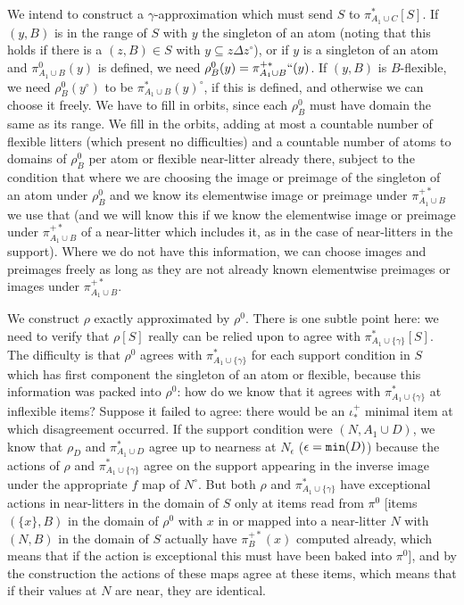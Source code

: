 \documentclass[112pt]{article}
\begin{document}
\begin{description}
We intend to construct a $\gamma$-approximation which must send $S$ to  $\pi_{A_1 \cup C}^*[S]$.  If $(y,B)$ is in the range of $S$ with $y$ the singleton of an atom 
(noting that this holds if  there is a $(z,B)\in S$ with $y \subseteq z \Delta z^\circ$), or if  $y$ is a singleton of an atom and $\pi_{A_1 \cup B}^0(y)$ is defined,
we need $\rho^0_B(y) = \pi_{A_1 \cup B}^{+*}``(y)$.  If $(y,B)$ is $B$-flexible, we need $\rho^0_B(y^\circ)$ to be $\pi_{A_1 \cup B}^*(y)^\circ$, if this is defined, and otherwise we can choose it freely.  We have to fill in orbits, since each $\rho^0_B$ must have domain the same as its range.  We fill in the orbits, adding at most a countable number of flexible litters (which present no difficulties) and a countable number of atoms to domains of $\rho^0_B$ per atom or flexible near-litter already there, subject to the condition that where we are choosing the image or preimage of the singleton of an atom under $\rho^0_B$ and we know  its elementwise image or preimage under $\pi_{A_1 \cup B}^{+*}$ we use that (and we will know this if
we know the elementwise image or preimage under $\pi_{A_1 \cup B}^{+*}$ of a near-litter which includes it, as in the case of near-litters in the support).  Where we do not have this information, we can choose
images and preimages freely as long as they are not already known elementwise preimages or images under $\pi_{A_1 \cup B}^{+*}$.  

We construct $\rho$ exactly approximated by $\rho^0$.  There is one subtle point here:  we need to verify that $\rho[S]$ really can be relied upon to agree with $\pi^*_{A_1 \cup \{\gamma\}}[S]$.  The difficulty
is that $\rho^0$ agrees with $\pi^*_{A_1 \cup \{\gamma\}}$ for each support condition in $S$ which has first component the singleton of an atom or flexible, because this information was packed into $\rho^0$:  how do we know that it agrees with $\pi^*_{A_1 \cup \{\gamma\}}$  at inflexible items?  Suppose it failed to agree:  there would be an $\iota^+_*$ minimal item at which
disagreement occurred.  If the support condition were $(N,A_1 \cup D)$, we know that $\rho_D$ and $\pi^*_{A_1 \cup D}$ agree up to nearness at $N_\epsilon$ ($\epsilon = {\tt min}(D)$)
because the actions of $\rho$ and  $\pi^*_{A_1 \cup \{\gamma\}}$ agree on the support appearing in the inverse image under the appropriate $f$ map
of $N^\circ$.  But both $\rho$ and  $\pi^*_{A_1 \cup \{\gamma\}}$ have exceptional actions in near-litters in the domain of $S$ only at items read from $\pi^0$ [items $(\{x\},B)$ in the domain of $\rho^0$ with $x$  in or mapped into a near-litter $N$ with $(N,B)$ in  the domain of $S$ actually have $\pi_B^{+*}(x)$ computed already, which means that if the action is exceptional  this must have been baked into $\pi^0$], and by the construction the actions of these maps agree at these items, which means that if their values at $N$ are near, they are identical.


\end{description}
\end{document}
